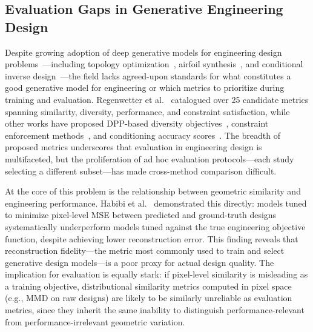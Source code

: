 \subsection{Evaluation Gaps in Generative Engineering Design}
\label{sec:engineering_metrics}

Despite growing adoption of deep generative models for engineering design problems~\cite{regenwetter2022deep}---including topology optimization~\cite{oh2019deep, nie2021topologygan}, airfoil synthesis~\cite{chen2019aerodynamic, chen2020beziergan, chen2022manifold}, and conditional inverse design~\cite{nobari2021pcdgan, nobari2021rangegan, habibi2024diffusion}---the field lacks agreed-upon standards for what constitutes a good generative model for engineering or which metrics to prioritize during training and evaluation.
Regenwetter et al.~\cite{regenwetter2023beyond} catalogued over 25 candidate metrics spanning similarity, diversity, performance, and constraint satisfaction, while other works have proposed DPP-based diversity objectives~\cite{ahmed2018ranking, chen2021padgan, chen2021mopadgan}, constraint enforcement methods~\cite{nobari2021rangegan, regenwetter2024negative}, and conditioning accuracy scores~\cite{nobari2021pcdgan}.
The breadth of proposed metrics underscores that evaluation in engineering design is multifaceted, but the proliferation of ad hoc evaluation protocols---each study selecting a different subset---has made cross-method comparison difficult.

At the core of this problem is the relationship between geometric similarity and engineering performance.
Habibi et al.~\cite{habibi2025mse} demonstrated this directly: models tuned to minimize pixel-level MSE between predicted and ground-truth designs systematically underperform models tuned against the true engineering objective function, despite achieving lower reconstruction error.
This finding reveals that reconstruction fidelity---the metric most commonly used to train and select generative design models---is a poor proxy for actual design quality.
The implication for evaluation is equally stark: if pixel-level similarity is misleading as a training objective, distributional similarity metrics computed in pixel space (e.g., MMD on raw designs) are likely to be similarly unreliable as evaluation metrics, since they inherit the same inability to distinguish performance-relevant from performance-irrelevant geometric variation.

